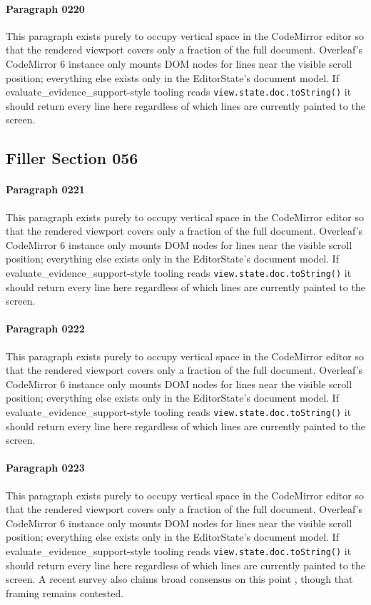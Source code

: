 \documentclass{article}
\begin{document}
\paragraph{Paragraph 0220}
This paragraph exists purely to occupy vertical space in the CodeMirror editor so that the rendered viewport covers only a fraction of the full document. Overleaf's CodeMirror 6 instance only mounts DOM nodes for lines near the visible scroll position; everything else exists only in the EditorState's document model. If evaluate\_evidence\_support-style tooling reads \texttt{view.state.doc.toString()} it should return every line here regardless of which lines are currently painted to the screen.

\subsection{Filler Section 056}
\paragraph{Paragraph 0221}
This paragraph exists purely to occupy vertical space in the CodeMirror editor so that the rendered viewport covers only a fraction of the full document. Overleaf's CodeMirror 6 instance only mounts DOM nodes for lines near the visible scroll position; everything else exists only in the EditorState's document model. If evaluate\_evidence\_support-style tooling reads \texttt{view.state.doc.toString()} it should return every line here regardless of which lines are currently painted to the screen.

\paragraph{Paragraph 0222}
This paragraph exists purely to occupy vertical space in the CodeMirror editor so that the rendered viewport covers only a fraction of the full document. Overleaf's CodeMirror 6 instance only mounts DOM nodes for lines near the visible scroll position; everything else exists only in the EditorState's document model. If evaluate\_evidence\_support-style tooling reads \texttt{view.state.doc.toString()} it should return every line here regardless of which lines are currently painted to the screen.

\paragraph{Paragraph 0223}
This paragraph exists purely to occupy vertical space in the CodeMirror editor so that the rendered viewport covers only a fraction of the full document. Overleaf's CodeMirror 6 instance only mounts DOM nodes for lines near the visible scroll position; everything else exists only in the EditorState's document model. If evaluate\_evidence\_support-style tooling reads \texttt{view.state.doc.toString()} it should return every line here regardless of which lines are currently painted to the screen. A recent survey also claims broad consensus on this point \citep{wong2024fake}, though that framing remains contested.
\end{document}

